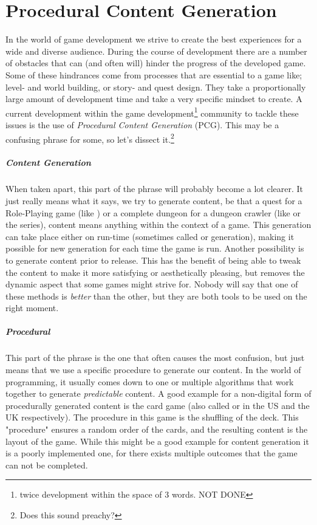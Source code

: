 \chapter{Procedural Content Generation}
In the world of game development we strive to create the best experiences for a wide and diverse audience. During the course of development there are a number of obstacles that can (and often will) hinder the progress of the developed game. Some of these hindrances come from processes that are essential to a game like; level- and world building, or story- and quest design. They take a proportionally large amount of development time and take a very specific mindset to create. A current development within the game development\footnote{twice development within the space of 3 words. NOT DONE} community to tackle these issues is the use of \textit{Procedural Content Generation} (PCG). This may be a confusing phrase for some, so let's dissect it.\footnote{Does this sound preachy?}
\paragraph{Content Generation} When taken apart, this part of the phrase will probably become a lot clearer. It just really means what it says, we try to generate content, be that a quest for a Role-Playing game (like ) or a complete dungeon for a dungeon crawler (like  or the  series), content means anything within the context of a game. This generation can take place either on run-time (sometimes called  or  generation), making it possible for new generation for each time the game is run. Another possibility is to generate content prior to release. This has the benefit of being able to tweak the content to make it more satisfying or aesthetically pleasing, but removes the dynamic aspect that some games might strive for. Nobody will say that one of these methods is \emph{better} than the other, but they are both tools to be used on the right moment. \paragraph{Procedural} This part of the phrase is the one that often causes the most confusion, but just means that we use a specific procedure to generate our content. In the world of programming, it usually comes down to one or multiple algorithms that work together to generate \emph{predictable} content. A good example for a non-digital form of procedurally generated content is the card game  (also called  or  in the US and the UK respectively). The procedure in this game is the shuffling of the deck. This "procedure" ensures a random order of the cards, and the resulting content is the layout of the game. While this might be a good example for content generation it is a poorly implemented one, for there exists multiple outcomes that the game can not be completed.
